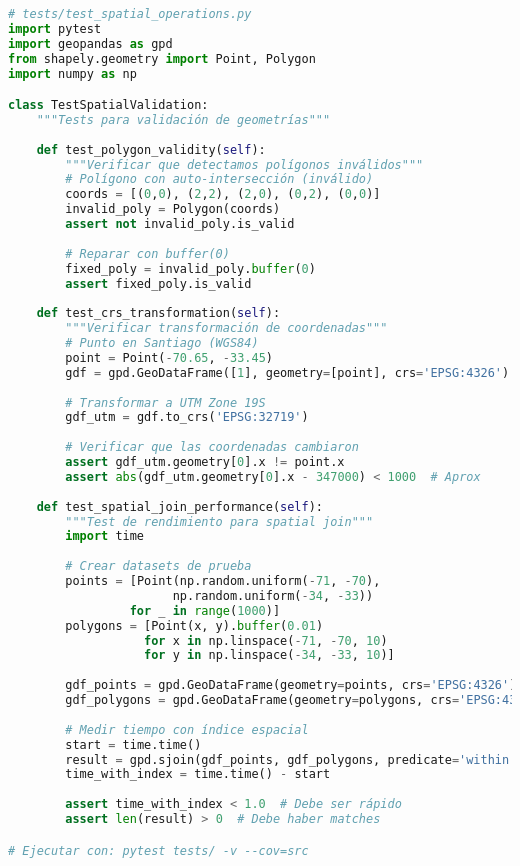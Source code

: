 \documentclass[11pt,a4paper]{article}
\begin{document}
\begin{lstlisting}[language=Python]
# tests/test_spatial_operations.py
import pytest
import geopandas as gpd
from shapely.geometry import Point, Polygon
import numpy as np

class TestSpatialValidation:
    """Tests para validación de geometrías"""
    
    def test_polygon_validity(self):
        """Verificar que detectamos polígonos inválidos"""
        # Polígono con auto-intersección (inválido)
        coords = [(0,0), (2,2), (2,0), (0,2), (0,0)]
        invalid_poly = Polygon(coords)
        assert not invalid_poly.is_valid
        
        # Reparar con buffer(0)
        fixed_poly = invalid_poly.buffer(0)
        assert fixed_poly.is_valid
    
    def test_crs_transformation(self):
        """Verificar transformación de coordenadas"""
        # Punto en Santiago (WGS84)
        point = Point(-70.65, -33.45)
        gdf = gpd.GeoDataFrame([1], geometry=[point], crs='EPSG:4326')
        
        # Transformar a UTM Zone 19S
        gdf_utm = gdf.to_crs('EPSG:32719')
        
        # Verificar que las coordenadas cambiaron
        assert gdf_utm.geometry[0].x != point.x
        assert abs(gdf_utm.geometry[0].x - 347000) < 1000  # Aprox
    
    def test_spatial_join_performance(self):
        """Test de rendimiento para spatial join"""
        import time
        
        # Crear datasets de prueba
        points = [Point(np.random.uniform(-71, -70), 
                       np.random.uniform(-34, -33)) 
                 for _ in range(1000)]
        polygons = [Point(x, y).buffer(0.01) 
                   for x in np.linspace(-71, -70, 10)
                   for y in np.linspace(-34, -33, 10)]
        
        gdf_points = gpd.GeoDataFrame(geometry=points, crs='EPSG:4326')
        gdf_polygons = gpd.GeoDataFrame(geometry=polygons, crs='EPSG:4326')
        
        # Medir tiempo con índice espacial
        start = time.time()
        result = gpd.sjoin(gdf_points, gdf_polygons, predicate='within')
        time_with_index = time.time() - start
        
        assert time_with_index < 1.0  # Debe ser rápido
        assert len(result) > 0  # Debe haber matches

# Ejecutar con: pytest tests/ -v --cov=src
\end{lstlisting}
\end{document}
